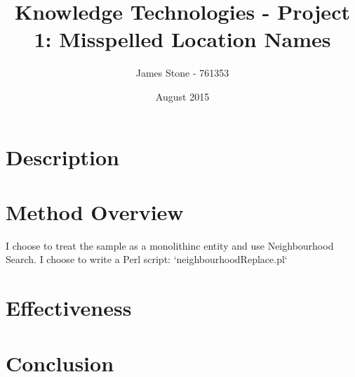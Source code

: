 \documentclass[a4paper]{article}
\title{Knowledge Technologies - Project 1: Misspelled Location Names}
\author{James Stone - 761353}
\date{August 2015}
\begin{document}
\maketitle

\section{Description}
\section{Method Overview}
I choose to treat the sample as a monolithinc entity and use Neighbourhood Search.
I choose to write a Perl script:  `neighbourhoodReplace.pl`
\section{Effectiveness}
\section{Conclusion}
\end{document}
